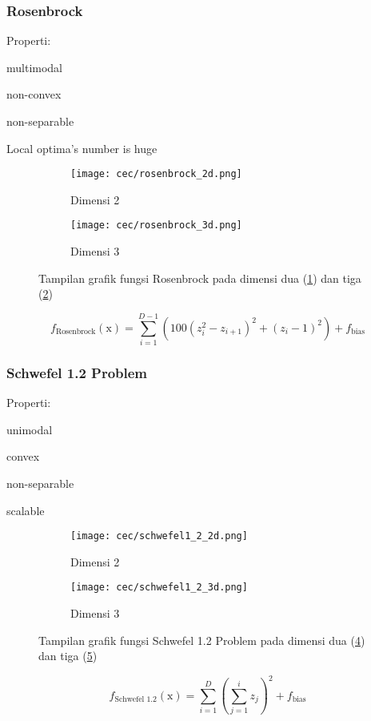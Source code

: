 \subsubsection*{Rosenbrock}
\noindent Properti:
\begin{packed_item}
  \item multimodal
  \item non-convex
  \item non-separable
  \item Local optima's number is huge
\end{packed_item}
\begin{figure}[H]
	\centering
	\begin{subfigure}[b]{0.4\textwidth}
		\centering
		\texttt{[image: cec/rosenbrock\_2d.png]}
		\caption{Dimensi 2}
		\label{fig:rosenbrock-2d}
	\end{subfigure}
	\hfill
	\begin{subfigure}[b]{0.4\textwidth}
		\centering
		\texttt{[image: cec/rosenbrock\_3d.png]}
		\caption{Dimensi 3}
		\label{fig:rosenbrock-3d}
	\end{subfigure}
	\caption{Tampilan grafik fungsi Rosenbrock pada dimensi dua (\cref{fig:rosenbrock-2d}) dan tiga (\cref{fig:rosenbrock-3d})}
	\label{fig:rosenbrock}
\end{figure}
\begin{equation}
  f_{\text{Rosenbrock}}(\mathrm{x})=\sum_{i=1}^{D-1}\left(100\left(z_i^2-z_{i+1} \right)^2+\left( z_i-1\right)^2 \right) +f_{\text{bias}}
\end{equation}

\subsubsection*{Schwefel 1.2 Problem}
\noindent Properti:
\begin{packed_item}
  \item unimodal
  \item convex
  \item non-separable
  \item scalable
\end{packed_item}
\begin{figure}[H]
	\centering
	\begin{subfigure}[b]{0.4\textwidth}
		\centering
		\texttt{[image: cec/schwefel1\_2\_2d.png]}
		\caption{Dimensi 2}
		\label{fig:schwefel1_2-2d}
	\end{subfigure}
	\hfill
	\begin{subfigure}[b]{0.4\textwidth}
		\centering
		\texttt{[image: cec/schwefel1\_2\_3d.png]}
		\caption{Dimensi 3}
		\label{fig:schwefel1_2-3d}
	\end{subfigure}
	\caption{Tampilan grafik fungsi Schwefel 1.2 Problem pada dimensi dua (\cref{fig:schwefel1_2-2d}) dan tiga (\cref{fig:schwefel1_2-3d})}
	\label{fig:schwefel1_2}
\end{figure}
\begin{equation}
  f_{\text{Schwefel 1.2}}(\mathrm{x})=\sum_{i=1}^{D}\left(\sum_{j=1}^{i}z_j \right)^2 +f_{\text{bias}}
\end{equation}

